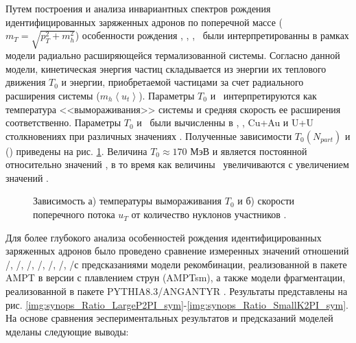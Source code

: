Путем построения и анализа инвариантных спектров рождения идентифицированных заряженных адронов по поперечной массе ($m_T = \sqrt{p_T^2 +m_h^2}$) особенности рождения \pipm, \Kpm, \prot, \aprot \ были интерпретированны в рамках модели радиально расширяющейся термализованной системы. Согласно данной модели, кинетическая энергия частиц складывается из энергии их теплового движения $T_0$ и энергии, приобретаемой частицами за счет радиального расширения системы ($m_h\left< u_t\right>$). Параметры $T_0$ и \ut \  интерпретируются как температура <<вымораживания>> системы и средняя скорость ее расширения соответственно. Параметры $T_{0}$ и \ut \ были вычисленны в \pal, \heau, Cu+Au и U+U столкновениях при различных значениях \Npart. 
Полученные зависимости $T_{0}(N_{part})$ и \ut(\Npart) приведены на рис. \ref{fig:synops_T0ut}. Величина $T_{0}\approx170$ МэВ и является постоянной относительно значений \Npart, в то время как величины \ut \ увеличиваются с увеличением значений \Npart.

\begin{figure}[ht]
	\caption{Зависимость а) температуры вымораживания $T_0$ и  б) скорости поперечного потока $u_T$ от количество нуклонов участников \Npart.}\label{fig:synops_T0ut}
\end{figure}
Для более глубокого анализа особенностей рождения идентифицированных заряженных адронов было проведено сравнение измеренных значений отношений  \pim/\pip, \Km/\Kp, \prot/\aprot, \prot/\pip, \aprot/\pim, \Kp/\pip, \Km/\pim с предсказаниями модели рекомбинации, реализованной в пакете AMPT в версии с плавлением струн (AMPTsm)\cite{AMPT}, а также модели фрагментации, реализованной в пакете PYTHIA8.3/ANGANTYR \cite{pythia}.
Результаты представлены на рис. \ref{img:synops_Ratio_LargeP2PI_sym}-\ref{img:synops_Ratio_SmallK2PI_sym}.
На основе сравнения эеспериментальных результатов и предсказаний моделей мделаны следующие выводы:


